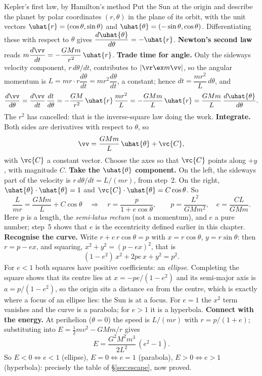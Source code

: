 
\begin{derivbox}{Kepler's first law, by Hamilton's method}
Put the Sun at the origin and describe the planet by polar coordinates $(r,\theta)$ in the plane of its
orbit, with the unit vectors $\uhat{r}=(\cos\theta,\sin\theta)$ and $\uhat{\theta}=(-\sin\theta,\cos\theta)$.
Differentiating these with respect to $\theta$ gives $\dfrac{d\uhat{\theta}}{d\theta}=-\uhat{r}$.
 \textbf{Newton's second law} reads $m\dfrac{d\vv}{dt}=-\dfrac{GMm}{r^2}\,\uhat{r}$.
 \textbf{Trade time for angle.} Only the sideways velocity component, $r\,d\theta/dt$, contributes to
$|\vr\ex m\vv|$, so the angular momentum is $L=mr\cdot r\dfrac{d\theta}{dt}=mr^2\dfrac{d\theta}{dt}$, a
constant; hence
$dt=\dfrac{mr^2}{L}\,d\theta$, and
\[
\frac{d\vv}{d\theta}=\frac{d\vv}{dt}\,\frac{dt}{d\theta}=-\frac{GM}{r^2}\,\uhat{r}\,\frac{mr^2}{L}
=-\frac{GMm}{L}\,\uhat{r}=\frac{GMm}{L}\,\frac{d\uhat{\theta}}{d\theta}.
\]
The $r^2$ has cancelled: that is the inverse-square law doing the work.
 \textbf{Integrate.} Both sides are derivatives with respect to $\theta$, so
\[
\vv=\frac{GMm}{L}\,\uhat{\theta}+\vc{C},
\]
with $\vc{C}$ a constant vector. Choose the axes so that $\vc{C}$ points along $+y$, with magnitude $C$.
 \textbf{Take the $\uhat{\theta}$ component.} On the left, the sideways part of the velocity is
$r\,d\theta/dt=L/(mr)$, from step~2. On the right, $\uhat{\theta}\cdot\uhat{\theta}=1$ and
$\vc{C}\cdot\uhat{\theta}=C\cos\theta$. So
\[
\frac{L}{mr}=\frac{GMm}{L}+C\cos\theta
\quad\Longrightarrow\quad
r=\frac{p}{1+e\cos\theta},\qquad p=\frac{L^2}{GMm^2},\quad e=\frac{CL}{GMm}.
\]
Here $p$ is a length, the \emph{semi-latus rectum} (not a momentum), and $e$ a pure number; step~5 shows
that $e$ is the eccentricity defined earlier in this chapter.
 \textbf{Recognise the curve.} Write $r+e\,r\cos\theta=p$ with $x=r\cos\theta$, $y=r\sin\theta$: then
$r=p-ex$, and squaring, $x^2+y^2=(p-ex)^2$, that is
\[
(1-e^2)\,x^2+2pe\,x+y^2=p^2 .
\]
For $e<1$ both squares have positive coefficients: an \emph{ellipse}. Completing the square shows that
its centre lies at $x=-pe/(1-e^2)$ and its semi-major axis is $a=p/(1-e^2)$, so the origin sits a distance
$ea$ from the centre, which is exactly where a focus of an ellipse lies: the Sun is at a focus. For
$e=1$ the $x^2$ term vanishes and the curve is a parabola; for $e>1$ it is a hyperbola.
 \textbf{Connect with the energy.} At perihelion ($\theta=0$) the speed is $L/(mr)$ with
$r=p/(1+e)$; substituting into $E=\tfrac12mv^2-GMm/r$ gives
\[
E=\frac{G^2M^2m^3}{2L^2}\,(e^2-1).
\]
So $E<0\Leftrightarrow e<1$ (ellipse), $E=0\Leftrightarrow e=1$ (parabola), $E>0\Leftrightarrow e>1$
(hyperbola): precisely the table of \S\ref{sec:escape}, now proved.
\end{derivbox}

